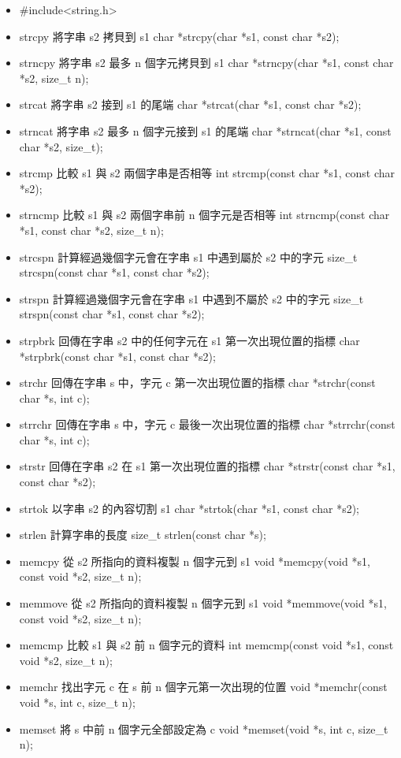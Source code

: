 \begin{itemize}
    \item #include<string.h>
    
    \item strcpy	將字串 s2 拷貝到 s1	char *strcpy(char *s1, const char *s2);
    \item strncpy	將字串 s2 最多 n 個字元拷貝到 s1	char *strncpy(char *s1, const char *s2, size_t n);
    \item strcat	將字串 s2 接到 s1 的尾端	char *strcat(char *s1, const char *s2);
    \item strncat	將字串 s2 最多 n 個字元接到 s1 的尾端	char *strncat(char *s1, const char *s2, size_t);
    \item strcmp	比較 s1 與 s2 兩個字串是否相等	int strcmp(const char *s1, const char *s2);
    \item strncmp	比較 s1 與 s2 兩個字串前 n 個字元是否相等	int strncmp(const char *s1, const char *s2, size_t n);
    \item strcspn	計算經過幾個字元會在字串 s1 中遇到屬於 s2 中的字元	size_t strcspn(const char *s1, const char *s2);
    \item strspn	計算經過幾個字元會在字串 s1 中遇到不屬於 s2 中的字元	size_t strspn(const char *s1, const char *s2);
    \item strpbrk	回傳在字串 s2 中的任何字元在 s1 第一次出現位置的指標	char *strpbrk(const char *s1, const char *s2);
    \item strchr	回傳在字串 s 中，字元 c 第一次出現位置的指標	char *strchr(const char *s, int c);
    \item strrchr	回傳在字串 s 中，字元 c 最後一次出現位置的指標	char *strrchr(const char *s, int c);
    \item strstr	回傳在字串 s2 在 s1 第一次出現位置的指標	char *strstr(const char *s1, const char *s2);
    \item strtok	以字串 s2 的內容切割 s1	char *strtok(char *s1, const char *s2);
    \item strlen	計算字串的長度	size_t strlen(const char *s);
    
    \item memcpy	從 s2 所指向的資料複製 n 個字元到 s1	void *memcpy(void *s1, const void *s2, size_t n);
    \item memmove	從 s2 所指向的資料複製 n 個字元到 s1	void *memmove(void *s1, const void *s2, size_t n);
    \item memcmp	比較 s1 與 s2 前 n 個字元的資料	int memcmp(const void *s1, const void *s2, size_t n);
    \item memchr	找出字元 c 在 s 前 n 個字元第一次出現的位置	void *memchr(const void *s, int c, size_t n);
    \item memset	將 s 中前 n 個字元全部設定為 c	void *memset(void *s, int c, size_t n);
    \end{itemize}